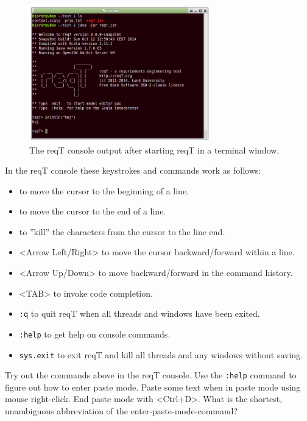 \documentclass[11pt]{article}
\begin{document}
\begin{figure}[h]
    \centering
    \includegraphics[width=0.7\textwidth]{console.png}
    \caption{The reqT console output after starting reqT in a terminal window.}
    \label{fig:console}
\end{figure}

In the reqT console these keystrokes and commands work as follows:
{\footnotesize 
\begin{itemize}[label={}]
\item <Ctrl+A> to move the cursor to the beginning of a line.
\item <Ctrl+E> to move the cursor to the end of a line.
\item <Ctrl+K> to ''kill'' the characters from the cursor to the line end.
\item <Arrow Left/Right> to move the cursor backward/forward within a line. 
\item <Arrow Up/Down> to move backward/forward in the command history. 
\item <TAB> to invoke code completion.
\item \verb+:q+ to quit reqT when all threads and windows have been exited.
\item \verb+:help+ to get help on console commands.
\item \verb+sys.exit+ to exit reqT and kill all threads and any windows without saving.
\end{itemize}
}

{\begin{framed}\noindent
Try out the commands above in the reqT console. Use the \verb+:help+ command to figure out how to enter paste mode. Paste some text when in paste mode using mouse right-click. End paste mode with <Ctrl+D>. What is the shortest, unambiguous abbreviation of the enter-paste-mode-command?  \underline{\hspace{2cm}}
\end{framed}}
\end{document}
